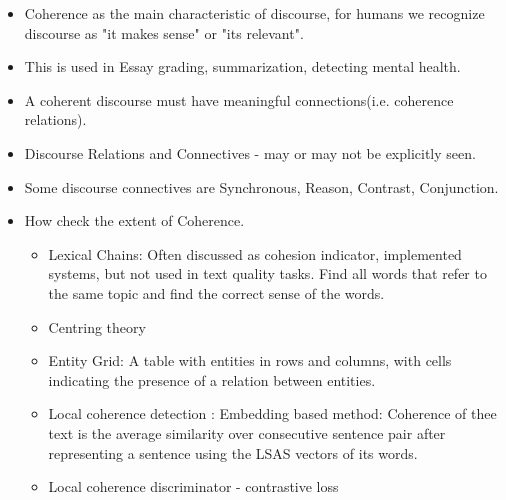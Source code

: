 \documentclass[12pt]{article}
\begin{document}
\begin{itemize}
        \item Coherence as the main characteristic of discourse, for humans we recognize discourse as "it makes sense" or "its relevant".
        \item This is used in Essay grading, summarization, detecting mental health.
        \item A coherent discourse must have meaningful connections(i.e. coherence relations).
        \item Discourse Relations and Connectives - may or may not be explicitly seen.
        \item Some discourse connectives are Synchronous, Reason, Contrast, Conjunction.
        \item How check the extent of Coherence.
        \begin{itemize}
            \item Lexical Chains: Often discussed as cohesion indicator, implemented systems, but not used in text quality tasks.
            Find all words that refer to the same topic and find the correct sense of the words.
            \item Centring theory
            \item Entity Grid: A table with entities in rows and columns, with cells indicating the presence of a relation between entities.
            \item Local coherence detection : Embedding based method: Coherence of thee text is the average similarity over consecutive sentence pair after representing a sentence
             using the LSAS vectors of its words.
            \item Local coherence discriminator - contrastive loss
            
        \end{itemize}
    \end{itemize}
\end{document}
